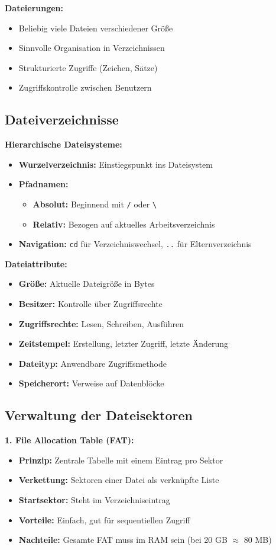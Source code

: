 \documentclass[9pt,a4paper]{extarticle}
\begin{document}
\begin{multicols*}{2}
\textbf{Dateierungen:}
\begin{itemize}
\item Beliebig viele Dateien verschiedener Größe
\item Sinnvolle Organisation in Verzeichnissen
\item Strukturierte Zugriffe (Zeichen, Sätze)
\item Zugriffskontrolle zwischen Benutzern
\end{itemize}

\subsection{Dateiverzeichnisse}
\textbf{Hierarchische Dateisysteme:}
\begin{itemize}
\item \textbf{Wurzelverzeichnis:} Einstiegspunkt ins Dateisystem
\item \textbf{Pfadnamen:}
  \begin{itemize}
  \item \textbf{Absolut:} Beginnend mit \texttt{/} oder \texttt{\textbackslash}
  \item \textbf{Relativ:} Bezogen auf aktuelles Arbeitsverzeichnis
  \end{itemize}
\item \textbf{Navigation:} \texttt{cd} für Verzeichniswechsel, \texttt{..} für Elternverzeichnis
\end{itemize}

\textbf{Dateiattribute:}
\begin{itemize}
\item \textbf{Größe:} Aktuelle Dateigröße in Bytes
\item \textbf{Besitzer:} Kontrolle über Zugriffsrechte
\item \textbf{Zugriffsrechte:} Lesen, Schreiben, Ausführen
\item \textbf{Zeitstempel:} Erstellung, letzter Zugriff, letzte Änderung
\item \textbf{Dateityp:} Anwendbare Zugriffsmethode
\item \textbf{Speicherort:} Verweise auf Datenblöcke
\end{itemize}

\subsection{Verwaltung der Dateisektoren}
\textbf{1. File Allocation Table (FAT):}
\begin{itemize}
\item \textbf{Prinzip:} Zentrale Tabelle mit einem Eintrag pro Sektor
\item \textbf{Verkettung:} Sektoren einer Datei als verknüpfte Liste
\item \textbf{Startsektor:} Steht im Verzeichniseintrag
\item \textbf{Vorteile:} Einfach, gut für sequentiellen Zugriff
\item \textbf{Nachteile:} Gesamte FAT muss im RAM sein (bei 20 GB $\approx$ 80 MB)
\end{itemize}


\end{multicols*}
\end{document}
